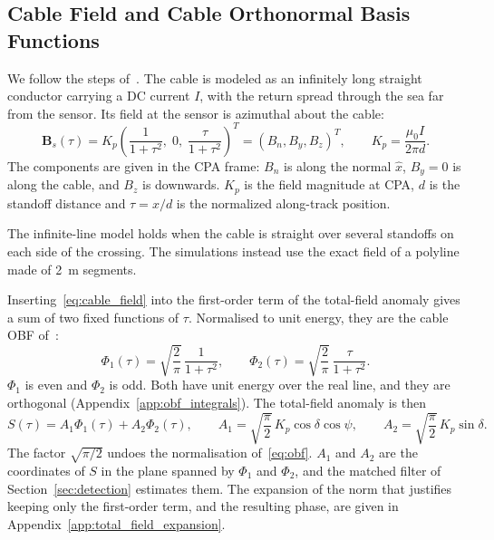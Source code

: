 \subsection{Cable Field and Cable Orthonormal Basis Functions}\label{subsec:cable_obf}

We follow the steps of~\cite{hleis2026obf}. The cable is modeled as an infinitely long straight conductor carrying a DC current $I$, with the return spread through the sea far from the sensor. Its field at the sensor is azimuthal about the cable:
\begin{equation}
    \mathbf{B}_s(\tau) = K_p \left( \frac{1}{1+\tau^2},\; 0,\; \frac{\tau}{1+\tau^2} \right)^{T} = (B_n, B_y, B_z)^{T},
    \qquad K_p = \frac{\mu_0 I}{2 \pi d}.
    \label{eq:cable_field}
\end{equation}
The components are given in the CPA frame: $B_n$ is along the normal $\hat{x}$, $B_y = 0$ is along the cable, and $B_z$ is downwards. $K_p$ is the field magnitude at CPA, $d$ is the standoff distance and $\tau = x/d$ is the normalized along-track position.

The infinite-line model holds when the cable is straight over several standoffs on each side of the crossing. The simulations instead use the exact field of a polyline made of 2~m segments.

Inserting~\eqref{eq:cable_field} into the first-order term of the total-field anomaly gives a sum of two fixed functions of $\tau$. Normalised to unit energy, they are the cable OBF of~\cite{hleis2026obf}:
\begin{equation}
    \Phi_1(\tau) = \sqrt{\frac{2}{\pi}}\,\frac{1}{1+\tau^{2}},
    \qquad
    \Phi_2(\tau) = \sqrt{\frac{2}{\pi}}\,\frac{\tau}{1+\tau^{2}}.
    \label{eq:obf}
\end{equation}
$\Phi_1$ is even and $\Phi_2$ is odd. Both have unit energy over the real line, and they are orthogonal (Appendix~\ref{app:obf_integrals}). The total-field anomaly is then
\begin{equation}
    S(\tau) = A_1 \Phi_1(\tau) + A_2 \Phi_2(\tau),
    \qquad
    A_1 = \sqrt{\frac{\pi}{2}}\,K_p \cos\delta \cos\psi,
    \qquad
    A_2 = \sqrt{\frac{\pi}{2}}\,K_p \sin\delta.
    \label{eq:total_field}
\end{equation}
The factor $\sqrt{\pi/2}$ undoes the normalisation of~\eqref{eq:obf}. $A_1$ and $A_2$ are the coordinates of $S$ in the plane spanned by $\Phi_1$ and $\Phi_2$, and the matched filter of Section~\ref{sec:detection} estimates them. The expansion of the norm that justifies keeping only the first-order term, and the resulting phase, are given in Appendix~\ref{app:total_field_expansion}.

